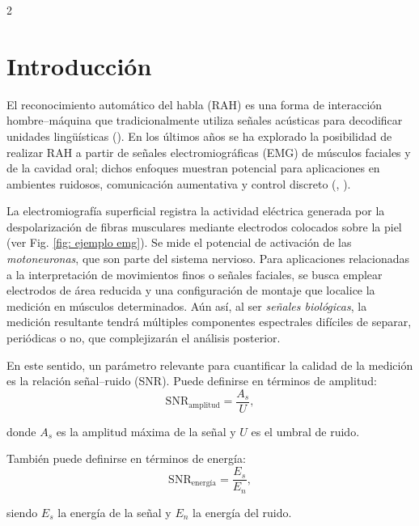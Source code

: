 \documentclass[11pt,letterpaper]{article}
\begin{document}
\begin{multicols*}{2}
\section{Introducción}

El reconocimiento automático del habla (RAH) es una forma de interacción hombre–máquina que tradicionalmente utiliza señales acústicas para decodificar unidades lingüísticas (\textcite{meltzner2018}). En los últimos años se ha explorado la posibilidad de realizar RAH a partir de señales electromiográficas (EMG) de músculos faciales y de la cavidad oral; dichos enfoques muestran potencial para aplicaciones en ambientes ruidosos, comunicación aumentativa y control discreto (\textcite{ratnovsky2021}, \textcite{schultz2010}).

La electromiografía superficial registra la actividad eléctrica generada por la despolarización de fibras musculares mediante electrodos colocados sobre la piel (ver Fig. \ref{fig: ejemplo emg}). Se mide el potencial de activación de las \textit{motoneuronas}, que son parte del sistema nervioso. Para aplicaciones relacionadas a la interpretación de movimientos finos o señales faciales, se busca emplear electrodos de área reducida y una configuración de montaje que localice la medición en músculos determinados. Aún así, al ser \textit{señales biológicas}, la medición resultante tendrá múltiples componentes espectrales difíciles de separar, periódicas o no, que complejizarán el análisis posterior.

En este sentido, un parámetro relevante para cuantificar la calidad de la medición es la relación señal–ruido (SNR). Puede definirse en términos de amplitud:
\begin{equation}
\label{eq: snr amplitud}
\mathrm{SNR}_{\text{amplitud}} = \frac{A_s}{U},
\end{equation}

\noindent donde $A_s$ es la amplitud máxima de la señal y $U$ es el umbral de ruido.

También puede definirse en términos de energía:
\begin{equation}
\label{eq: snr energia}
\mathrm{SNR}_{\text{energía}} = \frac{E_s}{E_n},
\end{equation}

 \noindent siendo $E_s$ la energía de la señal y $E_n$ la energía del ruido.


\end{multicols*}
\end{document}
